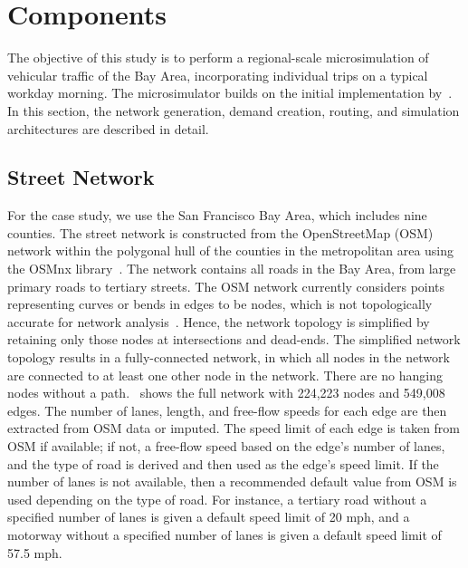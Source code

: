 \documentclass[final]{IEEEtran}
\begin{document}
\section{Components}
The objective of this study is to perform a regional-scale microsimulation of vehicular traffic of the Bay Area, incorporating individual trips on a typical workday morning. The microsimulator builds on the initial implementation by~\cite{garcia-doradoDesigningLargescaleInteractive2014, waddellIntegratedPipelineArchitecture2018}. In this section, the network generation, demand creation, routing, and simulation architectures are described in detail. 


\subsection{Street Network}

For the case study, we use the San Francisco Bay Area, which includes nine counties. The street network is constructed from the OpenStreetMap (OSM) network within the polygonal hull of the counties in the metropolitan area using the OSMnx library~\cite{boeingOSMnxNewMethods2017a}. The network contains all roads in the Bay Area, from large primary roads to tertiary streets. The OSM network currently considers points representing curves or bends in edges to be nodes, which is not topologically accurate for network analysis~\cite{waddellIntegratedPipelineArchitecture2018, boeingOSMnxNewMethods2017a}. Hence, the network topology is simplified by retaining only those nodes at intersections and dead-ends. The simplified network topology results in a fully-connected network, in which all nodes in the network are connected to at least one other node in the network. There are no hanging nodes without a path.~ shows the full network with 224,223 nodes and 549,008 edges. The number of lanes, length, and free-flow speeds for each edge are then extracted from OSM data or imputed. The speed limit of each edge is taken from OSM if available; if not, a free-flow speed based on the edge's number of lanes, and the type of road is derived and then used as the edge's speed limit. If the number of lanes is not available, then a recommended default value from OSM is used depending on the type of road. For instance, a tertiary road without a specified number of lanes is given a default speed limit of 20 mph, and a motorway without a specified number of lanes is given a default speed limit of 57.5 mph.
\end{document}
